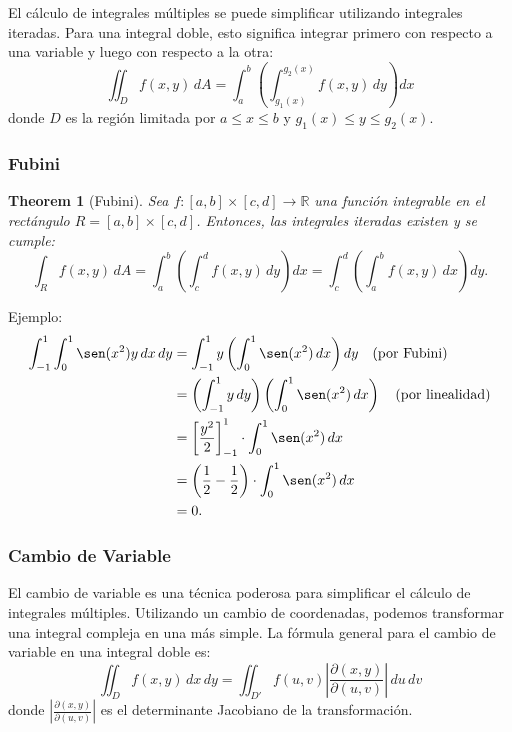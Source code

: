 \documentclass[11pt]{book}
\theoremstyle{definicion}
\theoremstyle{teorema}
\theoremstyle{ejemplo}
\newtheorem{theorem}{Theorem}
\begin{document}
El cálculo de integrales múltiples se puede simplificar utilizando integrales iteradas. Para una integral doble, esto significa integrar primero con respecto a una variable y luego con respecto a la otra:
\[
\iint_D f(x, y) \, dA = \int_{a}^{b} \left( \int_{g_1(x)}^{g_2(x)} f(x, y) \, dy \right) dx
\]
donde \( D \) es la región limitada por \( a \leq x \leq b \) y \( g_1(x) \leq y \leq g_2(x) \).

\subsubsection{Fubini}

\begin{theorem}[Fubini]
Sea \( f: [a,b] \times [c,d] \to \mathbb{R} \) una función integrable en el rectángulo \( R = [a,b] \times [c,d] \).
Entonces, las integrales iteradas existen y se cumple:
\[
\int_{R} f(x,y) \, dA = \int_{a}^{b} \left( \int_{c}^{d} f(x,y) \, dy \right) dx = \int_{c}^{d} \left( \int_{a}^{b} f(x,y) \, dx \right) dy.
\]
\end{theorem}
\noindent Ejemplo:
\[
\begin{aligned}
\int_{-1}^{1} \int_{0}^{1} \sen(x^2) y \, dx \, dy
&= \int_{-1}^{1} y \left( \int_{0}^{1} \sen(x^2) \, dx \right) dy \quad \text{(por Fubini)} \\
&= \left( \int_{-1}^{1} y \, dy \right) \left( \int_{0}^{1} \sen(x^2) \, dx \right) \quad \text{(por linealidad)} \\
&= \left[ \frac{y^2}{2} \right]_{-1}^{1} \cdot \int_{0}^{1} \sen(x^2) \, dx \\
&= \left( \frac{1}{2} - \frac{1}{2} \right) \cdot \int_{0}^{1} \sen(x^2) \, dx \\
&= 0.
\end{aligned}
\]

\subsubsection{Cambio de Variable}

El cambio de variable es una técnica poderosa para simplificar el cálculo de integrales múltiples. Utilizando un cambio de coordenadas, podemos transformar una integral compleja en una más simple. La fórmula general para el cambio de variable en una integral doble es:
\[
\iint_D f(x, y) \, dx \, dy = \iint_{D'} f(u, v) \left| \frac{\partial(x, y)}{\partial(u, v)} \right| \, du \, dv
\]
donde \( \left| \frac{\partial(x, y)}{\partial(u, v)} \right| \) es el determinante Jacobiano de la transformación.
\end{document}
